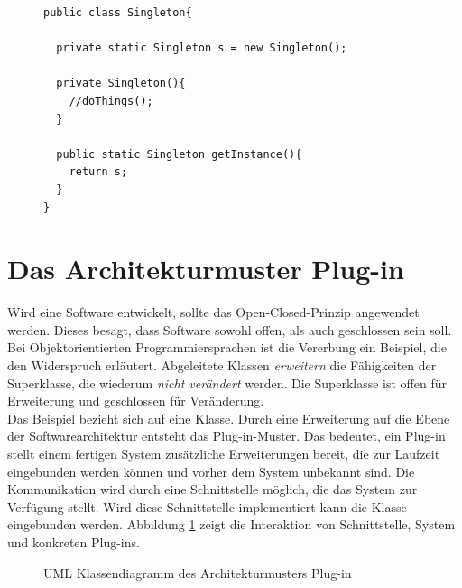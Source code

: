 \begin{figure}[htbp]
\begin{lstlisting}[frame=leftline]
public class Singleton{
		
  private static Singleton s = new Singleton();
		  
  private Singleton(){
    //doThings();
  }
		  
  public static Singleton getInstance(){
    return s;
  }
}
\end{lstlisting}

\end{figure}

\section{Das Architekturmuster Plug-in}

Wird eine Software entwickelt, sollte das Open-Closed-Prinzip angewendet werden. Dieses besagt, dass Software sowohl offen, als auch geschlossen sein soll\cite[1.8]{goll:swa}. Bei Objektorientierten Programmiersprachen ist die Vererbung ein Beispiel, die den Widerspruch erläutert. Abgeleitete Klassen \textit{erweitern} die Fähigkeiten der Superklasse, die wiederum \textit{nicht verändert} werden. Die Superklasse ist offen für Erweiterung und geschlossen für Veränderung.\\
Das Beispiel bezieht sich auf eine Klasse. Durch eine Erweiterung auf die Ebene der Softwarearchitektur entsteht das Plug-in-Muster. Das bedeutet, ein Plug-in stellt einem fertigen System zusätzliche Erweiterungen bereit, die zur Laufzeit eingebunden werden können und vorher dem System unbekannt sind. Die Kommunikation wird durch eine Schnittstelle möglich, die das System zur Verfügung stellt. Wird diese Schnittstelle implementiert kann die Klasse eingebunden werden. Abbildung \ref{pluginpattern} zeigt die Interaktion von Schnittstelle, System und konkreten Plug-ins.

\begin{figure}[htbp]
  \vspace{0.5cm}
  \centering
   \caption{UML Klassendiagramm des Architekturmusters Plug-in}
  \label{pluginpattern}
  \vspace{0.5cm}
\end{figure}